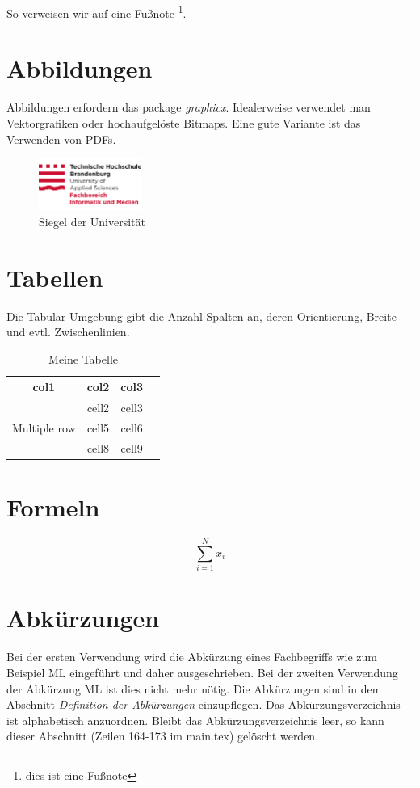 So verweisen wir auf eine Fußnote \footnote{dies ist eine Fußnote}.

\section{Abbildungen}

Abbildungen erfordern das package \textit{graphicx}. 
Idealerweise verwendet man Vektorgrafiken oder hochaufgelöste Bitmaps. 
Eine gute Variante ist das Verwenden von PDFs.

\begin{figure}[h]
    \centering
    \includegraphics[width=0.3\textwidth]{figs/2015_10_05_THB_FB-IM_Logo_RGB.pdf}
    \caption{Siegel der Universität}
    \label{fig:my_label}
\end{figure}


\section{Tabellen}

Die Tabular-Umgebung gibt die Anzahl Spalten an, deren Orientierung, Breite und evtl. Zwischenlinien. 


\begin{table}[ht]
    \centering
    \caption{Meine Tabelle}
        \begin{tabular}{ cccc } 
        \toprule
        col1 & col2 & col3 \\
        \midrule
        \multirow{3}{4em}{Multiple row} & cell2 & cell3 \\ 
        & cell5 & cell6 \\ 
        & cell8 & cell9 \\ 
        \bottomrule
    \end{tabular}
    \label{tab:countries}
\end{table}

\section{Formeln}

\begin{equation}
    \sum_{i=1}^N x_i
    \label{eq:1}
\end{equation}

\section{Abkürzungen}
Bei der ersten Verwendung wird die Abkürzung eines Fachbegriffs wie zum Beispiel \ac{ML} eingeführt und daher ausgeschrieben. Bei der zweiten Verwendung der Abkürzung \ac{ML} ist dies nicht mehr nötig. Die Abkürzungen sind in dem Abschnitt \textit{Definition der Abkürzungen} einzupflegen. Das Abkürzungsverzeichnis ist alphabetisch anzuordnen. Bleibt das Abkürzungsverzeichnis leer, so kann dieser Abschnitt (Zeilen 164-173 im main.tex) gelöscht werden.


